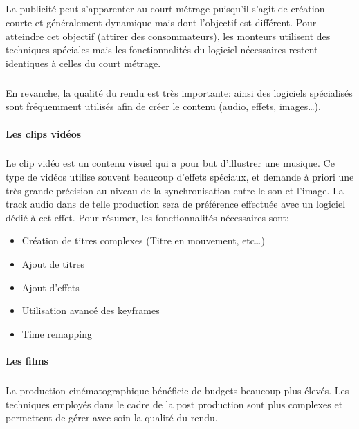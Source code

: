 \subparagraph{}

La publicité peut s'apparenter au court métrage puisqu'il s'agit de
création courte et généralement dynamique mais dont l'objectif est
différent.  Pour atteindre cet objectif (attirer des consommateurs),
les monteurs utilisent des techniques spéciales mais les fonctionnalités
du logiciel nécessaires restent identiques à celles du court métrage.

\subparagraph{}

En revanche, la qualité du rendu est très importante: ainsi des
logiciels spécialisés sont fréquemment utilisés afin de créer le
contenu (audio, effets, images\ldots).

\paragraph {Les clips vidéos}

\subparagraph{}

Le clip vidéo est un contenu visuel qui a pour but d'illustrer une
musique. Ce type de vidéos utilise souvent beaucoup d'effets spéciaux,
et demande à priori une très grande précision au niveau de la
synchronisation entre le son et l'image. La track audio dans de telle
production sera de préférence effectuée avec un logiciel dédié à
cet effet. Pour résumer, les fonctionnalités nécessaires sont:

\begin{itemize} \setlength{\itemsep}{2mm}

  \item{Création de titres complexes (Titre en mouvement, etc\ldots)}

  \item{Ajout de titres}

  \item{Ajout d'effets}

  \item{Utilisation avancé des keyframes}

  \item{Time remapping}

\end{itemize}

\paragraph {Les films}

\subparagraph{}

La production cinématographique bénéficie de budgets beaucoup plus
élevés. Les techniques employés dans le cadre de la post production
sont plus complexes et permettent de gérer avec soin la qualité
du rendu.

